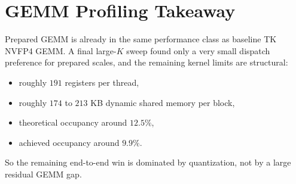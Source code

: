 \documentclass[11pt]{article}
\begin{document}
\section{GEMM Profiling Takeaway}

Prepared GEMM is already in the same performance class as baseline TK NVFP4 GEMM. A final large-$K$ sweep found only a very small dispatch preference for prepared scales, and the remaining kernel limits are structural:

\begin{itemize}
\item roughly \(191\) registers per thread,
\item roughly \(174\) to \(213\) KB dynamic shared memory per block,
\item theoretical occupancy around \(12.5\%\),
\item achieved occupancy around \(9.9\%\).
\end{itemize}

So the remaining end-to-end win is dominated by quantization, not by a large residual GEMM gap.
\end{document}
